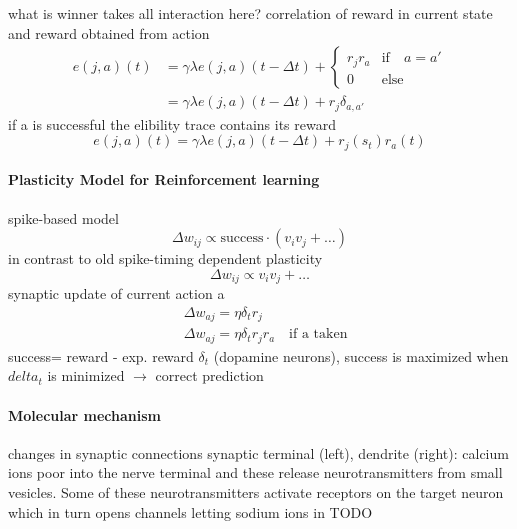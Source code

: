 \documentclass[11pt]{article}
\begin{document}
what is winner takes all interaction here?
correlation of reward in current state and reward obtained from action
\begin{align*}
e(j,a)(t)&=\gamma\lambda e(j,a)(t-\Delta t)+\left\{\begin{array}{ll} r_jr_a & \text{if}\quad a=a'\\ 0 & \text{else}\end{array}\right.\\
&=\gamma\lambda e(j,a)(t-\Delta t)+r_j\delta_{a,a'}
\end{align*}
if a is successful the elibility trace contains its reward 
\[
e(j,a)(t)=\gamma\lambda e(j,a)(t-\Delta t)+r_j(s_t)r_a(t)
\]

\paragraph{Plasticity Model for Reinforcement learning}
spike-based model
\[
\Delta w_{ij} \propto \text{success}\cdot(v_i v_j + \dots)
\]
in contrast to old spike-timing dependent plasticity
\[
\Delta w_{ij} \propto v_i v_j + \dots
\]
synaptic update of current action a
\begin{align*}
&\Delta w_{aj}=\eta \delta_t r_j\\
&\Delta w_{aj}=\eta \delta_t r_jr_a\quad \text{if a taken}
\end{align*}
success= reward - exp. reward $\delta_t$ (dopamine neurons), success is maximized when $delta_t$ is minimized $\rightarrow$ correct prediction

\paragraph{Molecular mechanism}
changes in synaptic connections
synaptic terminal (left), dendrite (right): calcium ions poor into the nerve terminal and these release neurotransmitters from small vesicles. Some of these neurotransmitters activate receptors on the target neuron which in turn opens channels letting sodium ions in
\textsc{TODO}
\end{document}
